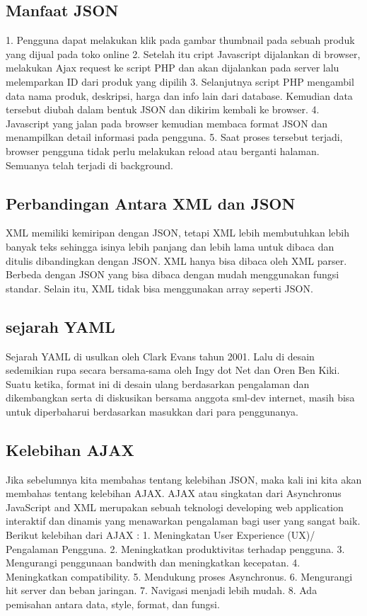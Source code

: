 \subsection{Manfaat JSON}
1.	Pengguna dapat melakukan klik pada gambar thumbnail pada sebuah produk yang dijual pada toko online
2.	Setelah itu cript Javascript dijalankan di browser, melakukan Ajax request ke script PHP dan akan dijalankan pada server lalu melemparkan ID dari produk yang dipilih
3.	Selanjutnya script PHP mengambil data nama produk, deskripsi, harga dan info lain dari database. Kemudian data tersebut diubah dalam bentuk JSON dan dikirim kembali ke browser.
4.	Javascript yang jalan pada browser kemudian membaca format JSON dan menampilkan detail informasi pada pengguna.
5.	Saat proses tersebut terjadi, browser pengguna tidak perlu melakukan reload atau berganti halaman. Semuanya telah terjadi di background.

\subsection{Perbandingan Antara XML dan JSON}
XML memiliki kemiripan dengan JSON, tetapi XML lebih membutuhkan lebih banyak teks sehingga isinya lebih panjang dan lebih lama untuk dibaca dan ditulis dibandingkan dengan JSON. XML hanya bisa dibaca oleh XML parser. Berbeda dengan JSON yang bisa dibaca dengan mudah menggunakan fungsi standar. Selain itu, XML tidak bisa menggunakan array seperti JSON.

\subsection{sejarah YAML}
Sejarah YAML di usulkan oleh Clark Evans tahun 2001. Lalu di desain sedemikian rupa secara bersama-sama oleh Ingy dot Net dan Oren Ben Kiki. Suatu ketika, format ini di desain ulang berdasarkan pengalaman dan dikembangkan serta di diskusikan bersama anggota sml-dev internet, masih bisa untuk diperbaharui berdasarkan masukkan dari para penggunanya.

\subsection{Kelebihan AJAX}
Jika sebelumnya kita membahas tentang kelebihan JSON, maka kali ini kita akan membahas tentang kelebihan AJAX. AJAX atau singkatan dari Asynchronus JavaScript and XML merupakan sebuah teknologi developing web application interaktif dan dinamis yang menawarkan pengalaman bagi user yang sangat baik. Berikut kelebihan dari AJAX :
1.	Meningkatan User Experience (UX)/ Pengalaman Pengguna.
2.	Meningkatkan produktivitas terhadap pengguna.
3.	Mengurangi penggunaan bandwith dan meningkatkan kecepatan.
4.	Meningkatkan compatibility.
5.	Mendukung proses Asynchronus.
6.	Mengurangi hit server dan beban jaringan.
7.	Navigasi menjadi lebih mudah.
8.	Ada pemisahan antara data, style, format, dan fungsi.

